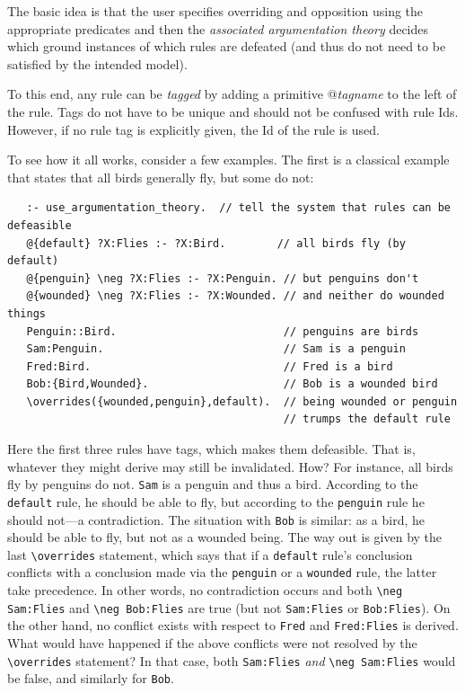 \documentclass[11pt]{article}
\newcommand{\bs}{\textbackslash}
\begin{document}
The basic idea is that the user specifies overriding and
opposition using the appropriate predicates and then the \emph{associated
argumentation theory} decides which ground instances of which rules are
defeated (and thus do not need to be satisfied by the intended model).  

To this end, any rule can be \emph{tagged} by adding
a primitive @{\emph{tagname}} to the left of the rule. Tags do not have to
be unique and should not be confused with rule Ids. However, if no rule tag
is explicitly given, the Id of the rule is used.

To see how it all works, consider a few examples. The first is a classical
example that states that all birds generally fly, but some do not:
\begin{verbatim}
   :- use_argumentation_theory.  // tell the system that rules can be defeasible
   @{default} ?X:Flies :- ?X:Bird.        // all birds fly (by default)
   @{penguin} \neg ?X:Flies :- ?X:Penguin. // but penguins don't
   @{wounded} \neg ?X:Flies :- ?X:Wounded. // and neither do wounded things
   Penguin::Bird.                          // penguins are birds
   Sam:Penguin.                            // Sam is a penguin
   Fred:Bird.                              // Fred is a bird
   Bob:{Bird,Wounded}.                     // Bob is a wounded bird
   \overrides({wounded,penguin},default).  // being wounded or penguin
                                           // trumps the default rule
\end{verbatim}
Here the first three rules have tags, which makes them defeasible. That is,
whatever they might derive may still be invalidated. How? For instance,
all birds fly by penguins do not. \texttt{Sam} is a penguin and thus a
bird. According to the \texttt{default}
rule, he should be able to fly, but according 
to the \texttt{penguin} rule he should not---a contradiction. 
The situation with \texttt{Bob} is similar: as a bird, he should be able to
fly, but not as a wounded being. The way out is given by the last
\texttt{\bs{}overrides} statement, which says that if a \texttt{default}
rule's conclusion conflicts with a conclusion made via the \texttt{penguin}
or a \texttt{wounded} rule, the latter take precedence. In other words, no
contradiction occurs and both \texttt{\bs{}neg Sam:Flies}   
and \texttt{\bs{}neg Bob:Flies} are true (but not \texttt{Sam:Flies} or
\texttt{Bob:Flies}).  On the other hand, no conflict exists with respect to
\texttt{Fred} and \texttt{Fred:Flies} is derived. What would have happened
if the above conflicts were not resolved by the \texttt{\bs{}overrides}
statement? In that case, both \texttt{Sam:Flies} \emph{and}
\texttt{\bs{}neg Sam:Flies} would be false, and similarly for \texttt{Bob}.
\end{document}
